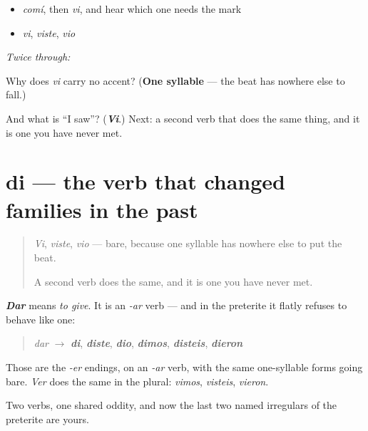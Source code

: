 \begin{itemize}
\raggedright
  \item \emph{comí}, then \emph{vi}, and hear which one needs the mark
  \item \emph{vi}, \emph{viste}, \emph{vio}
\end{itemize}

\emph{Twice through:}

\begin{tcolorbox}[breakable,colback=teal!4,colframe=teal!35!black,title={Before you move on}]
Why does \emph{vi} carry no accent? (\textbf{One syllable} — the beat has nowhere else to fall.)

And what is \textquotedblleft{}I saw\textquotedblright{}? (\emph{\textbf{Vi}}.) Next: a second verb that does the same thing, and it is one you have never met.
\end{tcolorbox}
\section[di]{di — the verb that changed families in the past}

\label{lesson:ES-C65-di}



\begin{quote}
\emph{Vi}, \emph{viste}, \emph{vio} — bare, because one syllable has nowhere else to put the beat.

A second verb does the same, and it is one you have never met.
\end{quote}

\begin{grammarlens}[title={Grammar Lens: dar, which behaves like an -er verb}]
\emph{\textbf{Dar}} means \emph{to give}. It is an \emph{-ar} verb — and in the preterite it flatly refuses to behave like one:

\begin{quote}
\emph{dar} $\to$ \emph{\textbf{di}}, \emph{\textbf{diste}}, \emph{\textbf{dio}}, \emph{\textbf{dimos}}, \emph{\textbf{disteis}}, \emph{\textbf{dieron}}
\end{quote}

Those are the \emph{-er} endings, on an \emph{-ar} verb, with the same one-syllable forms going bare. \emph{Ver} does the same in the plural: \emph{vimos}, \emph{visteis}, \emph{vieron}.

Two verbs, one shared oddity, and now the last two named irregulars of the preterite are yours.
\end{grammarlens}

